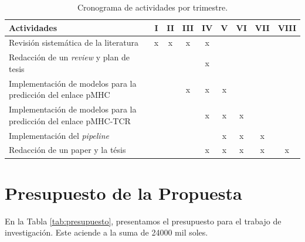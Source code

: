 \documentclass[a4paper]{article}
\begin{document}
\begin{table}[H]
	\centering
	\setlength{\tabcolsep}{0.5em} %
	{\renewcommand{\arraystretch}{1.2}%
		\caption{Cronograma de actividades por trimestre.}
		\label{tab:actv}
	\begin{tabular}{|p{6cm}|c|c|c|c|c|c|c|c|} \hline
		\textbf{Actividades}                                              & I & II & III & IV & V & VI & VII & VIII \\ \hline
		Revisión sistemática de la literatura                              & x                     & x                      & x                       & x                      &                       &                        &                         &                          \\
		Redacción de un \textit{review} y plan de tesis                             &                       &                        &                         & x                      &                       &                        &                         &                          \\
		Implementación de modelos para la predicción del   enlace pMHC     &                       &                        & x                       & x                      & x                     &                        &                         &                          \\
		Implementación de modelos para la predicción del   enlace pMHC-TCR &                       &                        &                         & x                      & x                     & x                      &                         &                          \\
		Implementación del \textit{pipeline}                                        &                       &                        &                         &                        & x                     & x                      & x                       &                          \\
		Redacción de un paper y la tésis                                   &                       &                        &                         & x                      & x                     & x                      & x                       & x                       \\ \hline
	\end{tabular}
}
\end{table}

\section{Presupuesto de la Propuesta}
En la Tabla \ref{tab:presupuesto}, presentamos el presupuesto para el trabajo de investigación. Este aciende a la suma de 24000 mil soles.
\end{document}
